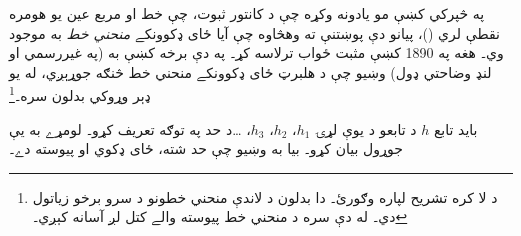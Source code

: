 \documentclass[../../../include/open-logic-section]{subfiles}
\begin{document}


په  څپرکي کښې مو يادونه وکړه چې د کانتور ثبوت، چې خط او مربع عين يو هومره نقطې لري ()، پيانو دې پوښتنې ته وهڅاوه چې آيا ځای ډکوونکے \emph{منحني خط} به موجود وي۔ هغه په 1890 کښې مثبت ځواب ترلاسه کړ۔ په دې برخه کښې به (په غيررسمي او لنډ وضاحتي ډول) وښيو چې د هلبرټ ځای ډکوونکے منحني خط څنګه جوړېږي، له يو ډېر وړوکي بدلون سره۔\footnote{د لا کره تشريح لپاره \cite{Rose2010} وګورئ۔ دا بدلون د لاندې منحني خطونو د سرو برخو زياتول دي۔ له دې سره د منحني خط پيوسته والے کتل لږ آسانه کېږي۔}

بايد تابع $h$ د تابعو د يوې لړۍ $h_1$، $h_2$، $h_3$، \dots\@ د حد په توګه تعريف کړو۔ لومړے به يې جوړول بيان کړو۔ بيا به وښيو چې حد شته، ځای ډکوي او پيوسته دے۔
\end{document}
